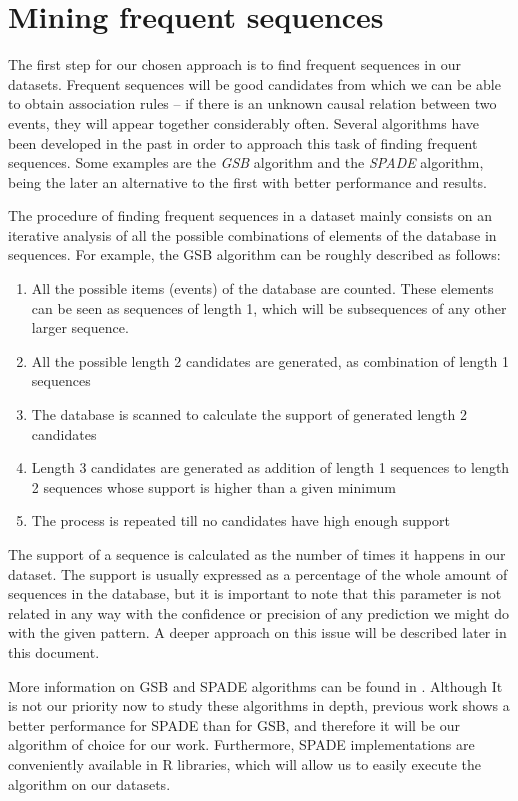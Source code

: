 \documentclass[a4paper,12pt]{article}
\begin{document}
\section{Mining frequent sequences}\label{sec:mining_sequences}
The first step for our chosen approach is to find frequent sequences in our datasets. Frequent sequences will be good candidates from which we can be able to obtain association rules -- if there is an unknown causal relation between two events, they will appear together considerably often. Several algorithms have been developed in the past in order to approach this task of finding frequent sequences. Some examples are the \emph{GSB} algorithm and the \emph{SPADE} algorithm, being the later an alternative to the first with better performance and results.

The procedure of finding frequent sequences in a dataset mainly consists on an iterative analysis of all the possible combinations of elements of the database in sequences. For example, the GSB algorithm can be roughly described as follows:

\begin{enumerate}
\item All the possible items (events) of the database are counted. These elements can be seen as sequences of length 1, which will be subsequences of any other larger sequence.
\item All the possible length 2 candidates are generated, as combination of length 1 sequences
\item The database is scanned to calculate the support of generated length 2 candidates
\item Length 3 candidates are generated as addition of length 1 sequences to length 2 sequences whose support is higher than a given minimum
\item The process is repeated till no candidates have high enough support
\end{enumerate}

The support of a sequence is calculated as the number of times it happens in our dataset. The support is usually expressed as a percentage of the whole amount of sequences in the database, but it is important to note that this parameter is not related in any way with the confidence or precision of any prediction we might do with the given pattern. A deeper approach on this issue will be described later in this document.

More information on GSB and SPADE algorithms can be found in \cite{zaki2001spade, zhao2003sequential, srikant1996mining}. Although It is not our priority now to study these algorithms in depth, previous work shows a better performance for SPADE than for GSB, and therefore it will be our algorithm of choice for our work. Furthermore, SPADE implementations are conveniently available in R libraries, which will allow us to easily execute the algorithm on our datasets.
\end{document}
